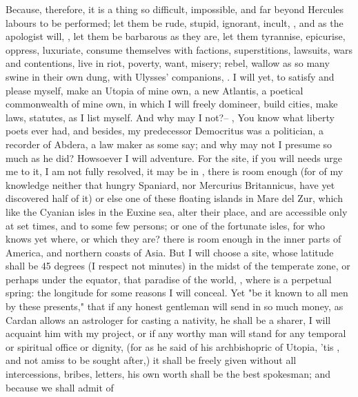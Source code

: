 Because, therefore, it is a thing so difficult, impossible, and far beyond
Hercules labours to be performed; let them be rude, stupid, ignorant, incult,
, and as the apologist will,
, let them be barbarous
as they are, let them tyrannise, epicurise, oppress,
luxuriate, consume themselves with factions, superstitions, lawsuits, wars and
contentions, live in riot, poverty, want, misery; rebel, wallow as so many
swine in their own dung, with Ulysses' companions, . I will yet, to satisfy and please myself, make an Utopia of mine
own, a new Atlantis, a poetical commonwealth of mine own, in which I will
freely domineer, build cities, make laws, statutes, as I list myself. And why
may I not?-- , \etc{} You know
what liberty poets ever had, and besides, my predecessor Democritus was a
politician, a recorder of Abdera, a law maker as some say; and why may not I
presume so much as he did? Howsoever I will adventure. For the site, if you
will needs urge me to it, I am not fully resolved, it may be in , there is room enough (for of my knowledge neither that
hungry Spaniard, nor Mercurius Britannicus, have yet
discovered half of it) or else one of these floating islands in Mare del Zur,
which like the Cyanian isles in the Euxine sea, alter their place, and are
accessible only at set times, and to some few persons; or one of the fortunate
isles, for who knows yet where, or which they are? there is room enough in the
inner parts of America, and northern coasts of Asia. But I will choose a site,
whose latitude shall be 45 degrees (I respect not minutes) in the midst of the
temperate zone, or perhaps under the equator, that paradise
of the world, , \etc{} where is a perpetual
spring: the longitude for some reasons I will conceal. Yet "be it known to all
men by these presents," that if any honest gentleman will send in so much
money, as Cardan allows an astrologer for casting a nativity, he shall be a
sharer, I will acquaint him with my project, or if any worthy man will stand
for any temporal or spiritual office or dignity, (for as he said of his
archbishopric of Utopia, 'tis , and not amiss to be sought
after,) it shall be freely given without all intercessions, bribes, letters,
\etc{} his own worth shall be the best spokesman; and because we shall admit of
